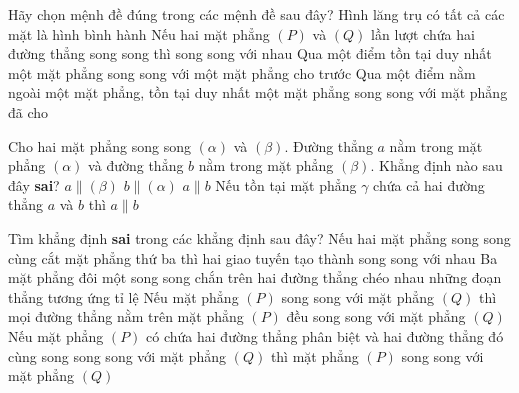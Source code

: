 \begin{ex}%
	Hãy chọn  mệnh đề đúng trong các mệnh đề sau đây?
	 \choice
		{Hình lăng trụ có tất  cả các mặt là hình bình hành}
		{Nếu hai mặt phẳng $(P)$ và $(Q)$ lần  lượt chứa hai đường thẳng song song thì song song với nhau}
		{Qua một điểm tồn  tại duy nhất một mặt phẳng song song với một mặt phẳng cho trước}
		{\True Qua một điểm nằm ngoài một mặt phẳng, tồn tại duy nhất một  mặt phẳng song song với mặt phẳng đã cho}
\end{ex}

\begin{ex}%
	Cho hai mặt phẳng song song $(\alpha)$ và $(\beta)$.  Đường thẳng $a$ nằm trong mặt phẳng $(\alpha)$ và đường thẳng $b$ nằm trong mặt phẳng $(\beta)$. Khẳng định nào sau đây \textbf{sai}?
	 \choice
		{$a \parallel  (\beta)$}
		 {$b \parallel (\alpha)$}
		{\True $a  \parallel b$}
		{Nếu tồn tại mặt phẳng $\gamma  $ chứa cả hai đường thẳng $a$ và $b$ thì $a \parallel b$}
\end{ex}

\begin{ex}%
	Tìm khẳng định {\bfseries sai} trong các khẳng định sau đây? 
	\choice 
		{Nếu  hai mặt phẳng song song cùng cắt mặt phẳng thứ ba thì hai giao tuyến tạo thành song song với nhau}
		{Ba mặt phẳng đôi một song song chắn trên hai  đường thẳng chéo nhau những đoạn thẳng tương ứng tỉ lệ}
		{Nếu mặt phẳng $(P)$ song song  với mặt phẳng $(Q)$ thì mọi đường thẳng nằm trên mặt phẳng $(P)$ đều song song với mặt phẳng $(Q)$}
		{\True Nếu mặt phẳng $(P)$ có chứa hai đường thẳng phân biệt và hai đường thẳng đó cùng song  song song với mặt phẳng $(Q)$ thì mặt phẳng $(P)$ song song với mặt phẳng $(Q)$}
\end{ex}

